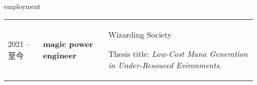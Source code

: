 
\begin{rubric}{employment}
    \begin{tabular}{@{}p{3cm}p{4cm}p{6cm}@{}}
        2021 -- 至今 & \textbf{magic power engineer} & Wizarding Society
        \par Thesis title: \emph{Low-Cost Mana Generation in Under-Resouced Evironments.}
    \end{tabular}
	
%
%
\end{rubric}
